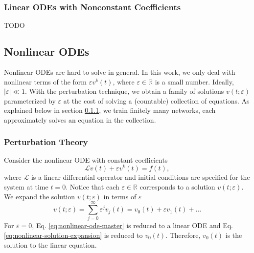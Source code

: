 \documentclass[accepted]{uai2023}
\renewcommand{\L}{\mathcal{L}}
\begin{document}
\subsubsection{Linear ODEs with Nonconstant Coefficients}
    TODO

\subsection{Nonlinear ODEs}
    Nonlinear ODEs are hard to solve in general. 
    In this work, we only deal with nonlinear terms of the form $\varepsilon v^k(t)$, where $\varepsilon \in \mathbb{R}$ is a small number. 
    Ideally, $|\varepsilon| \ll 1$. 
    With the perturbation technique, we obtain a family of solutions $v(t;\varepsilon)$ parameterized by $\varepsilon$ at the cost of solving a (countable) collection of equations. 
    As explained below in section \ref{section:perturbation-theory}, we train finitely many networks, each approximately solves an equation in the collection.

\subsubsection{Perturbation Theory} \label{section:perturbation-theory}
    Consider the nonlinear ODE with constant coefficients
    \begin{equation} \label{eq:nonlinear-ode-master}
        \L v(t) + \varepsilon v^k(t) = f(t),
    \end{equation}
    where $\L$ is a linear differential operator and initial conditions are specified for the system at time $t=0$. 
    Notice that each $\varepsilon \in \mathbb{R}$ corresponds to a solution $v(t; \varepsilon)$. 
    We expand the solution $v(t; \varepsilon)$ in terms of $\varepsilon$
    \begin{equation} \label{eq:nonlinear-solution-expansion}
        v(t; \varepsilon) = \sum_{j=0}^{\infty} \varepsilon^j v_j(t) = v_0(t) + \varepsilon v_1(t) + \dots
    \end{equation}
    For $\varepsilon = 0$, Eq. \ref{eq:nonlinear-ode-master} is reduced to a linear ODE and Eq. \ref{eq:nonlinear-solution-expansion} is reduced to $v_0(t)$. Therefore, $v_0(t)$ is the solution to the linear equation. 
\end{document}
